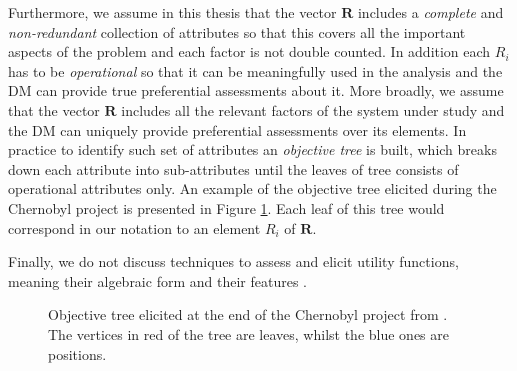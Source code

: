 Furthermore, we  assume in this thesis that the vector $\bm{R}$ includes a \textit{complete} and \textit{non-redundant} collection of attributes so that this covers all the important aspects of the problem and each factor is not double counted. In addition each $R_i$ has to be \textit{operational} so that it can be meaningfully used in the analysis and the \gls{DM} can provide true preferential assessments about it.  More broadly, we assume that the vector $\bm{R}$ includes all the relevant factors of the system under study and the \gls{DM} can uniquely provide preferential assessments over its elements. In practice to identify such set of attributes an \textit{objective tree} \citep{Keeney1993a} is built, which breaks down each attribute into sub-attributes until the leaves of tree consists of operational attributes only. An example of the objective tree elicited during the Chernobyl project is presented in Figure \ref{fig:objtree}. Each leaf of this tree would correspond in our notation to an element $R_i$ of $\bm{R}$.

Finally, we do not discuss techniques to assess and elicit utility functions, meaning their algebraic form and their  features \citep[see e.g.][]{Keeney1993a}.

\begin{figure}
\begin{center}

\end{center}
\caption{Objective tree elicited at the end of the Chernobyl project from \citet{Papamichail2013}. The vertices in red of the tree are leaves, whilst the blue ones are positions. \label{fig:objtree}}
\end{figure}
 
